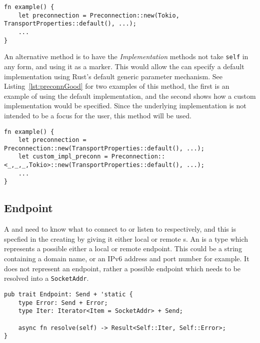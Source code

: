 \begin{lstlisting}[float=h, label=lst:preconnBad, caption={An example of how to construct a
Preconnection if the Implementation trait is to be passed when the Preconnection is constructed}]
fn example() {
    let preconnection = Preconnection::new(Tokio, TransportProperties::default(), ...);
    ...
}
\end{lstlisting}

An alternative method is to have the \emph{Implementation} methods not take \texttt{self} in any form, and using it as a
marker.
This would allow the \preconnection{} can specify a default implementation using Rust's default generic parameter
mechanism.
See Listing~\ref{lst:preconnGood} for two examples of this method, the first \preconnection{} is an example of using
the default implementation, and the second \preconnection{} shows how a custom implementation would be specified.
Since the underlying implementation is not intended to be a focus for the user, this method will be used.

\begin{lstlisting}[float=h, label=lst:preconnGood, caption={An example of how to construct a
Preconnection if the Implementation trait is used as a marker.}]
fn example() {
    let preconnection = Preconnection::new(TransportProperties::default(), ...);
    let custom_impl_preconn = Preconnection::<_,_,_,Tokio>::new(TransportProperties::default(), ...);
    ...
}
\end{lstlisting}

\subsection{Endpoint}\label{subsec:endpoint}
A \connection{} and \listener{} need to know what to connect to or listen to respectively, and this is specfied in the
creating \preconnection{} by giving it either local or remote \Endpoint{}s.
An \Endpoint{} is a type which represents a possible either a local or remote endpoint.
This could be a string containing a domain name, or an IPv6 address and port number for example.
It does not represent an endpoint, rather a possible endpoint which needs to be resolved into a \texttt{SocketAddr}.

\begin{lstlisting}[float=h, label=lst:endpoint, caption={The Endpoint Trait with the resolve method returning an
        Iterator.}]
pub trait Endpoint: Send + 'static {
    type Error: Send + Error;
    type Iter: Iterator<Item = SocketAddr> + Send;

    async fn resolve(self) -> Result<Self::Iter, Self::Error>;
}
\end{lstlisting}

